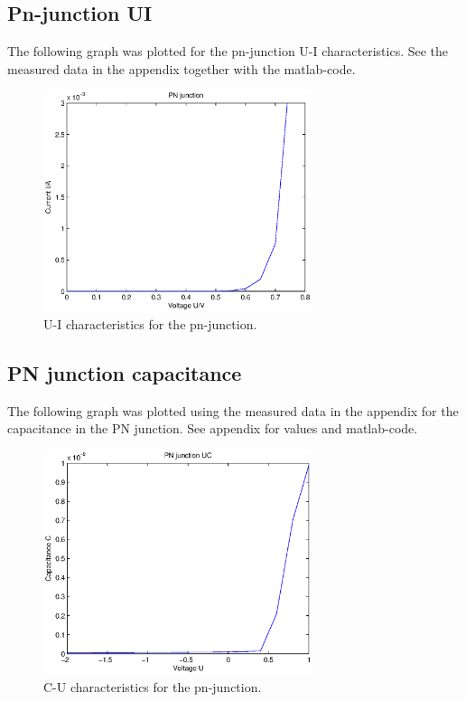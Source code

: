 \documentclass[a4paper]{article}
\begin{document}
\subsection{Pn-junction UI}
The following graph was plotted for the pn-junction U-I characteristics. See the measured data in the appendix together with the matlab-code. 
\begin{figure}[H]
	\centering
	\includegraphics[width=0.7\textwidth]{pn_ui.eps}
	\caption{U-I characteristics for the pn-junction.}
	\label{pn_ui}
\end{figure}

\subsection{PN junction capacitance}
The following graph was plotted using the measured data in the appendix for the capacitance in the PN junction. See appendix for values and matlab-code. 
\begin{figure}[H]
	\centering
	\includegraphics[width=0.7\textwidth]{pn_cap.eps}
	\caption{C-U characteristics for the pn-junction.}	
	\label{pn_cap}
\end{figure}
\end{document}
